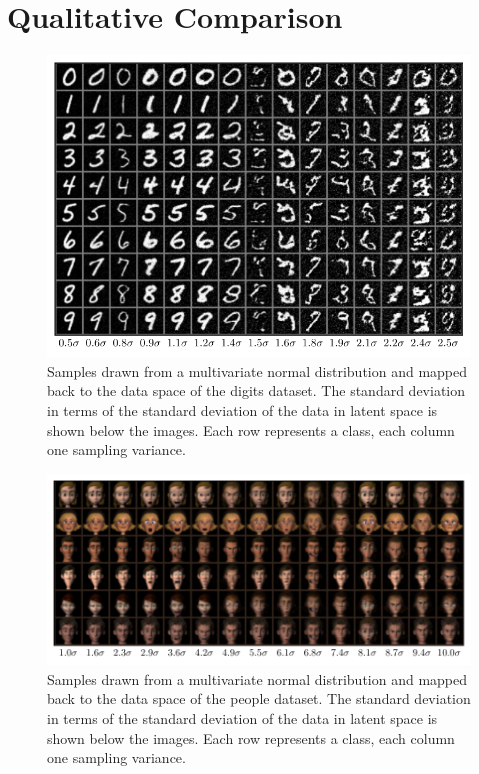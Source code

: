 \section{Qualitative Comparison}%
\label{sec:qualitative_comparison}

\begin{figure}[htpb]
	\centering
        \includegraphics{figures/samples/samples_increasing_distance_EMNIST.pdf}
	\caption{Samples drawn from a multivariate normal distribution and
		mapped back to the data space of the digits dataset. The standard
		deviation in terms of the standard deviation of the data in latent
		space is shown below the images. Each row represents a class, each
		column one sampling variance.}%
	\label{fig:emnist_sample_sigma}
\end{figure}

\begin{figure}[htpb]
	\centering
        \includegraphics{figures/samples/samples_increasing_distance_FERG_people.pdf}
	\caption{Samples drawn from a multivariate normal distribution and
		mapped back to the data space of the people dataset. The standard
		deviation in terms of the standard deviation of the data in latent
		space is shown below the images. Each row represents a class, each
		column one sampling variance.}%
	\label{fig:ferg_sample_sigma}
\end{figure}


